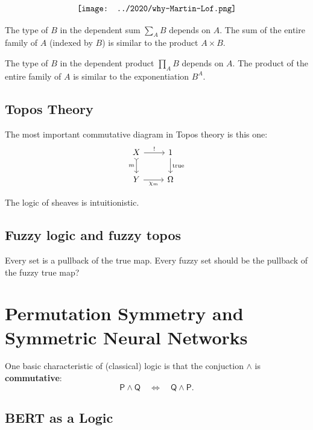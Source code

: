 \documentclass[orivec]{llncs}
\begin{document}
\begin{equation}
\label{eqn:2-levels-of-TT}
\vcenter{\hbox{\texttt{[image: ../2020/why-Martin-Lof.png]}}}
\end{equation}

The type of $B$ in the dependent sum $\displaystyle \sum_A B$ depends on $A$. The sum of the entire family of $A$ (indexed by $B$) is similar to the product $A \times B$.

The type of $B$ in the dependent product $\displaystyle \prod_A B$ depends on $A$. The product of the entire family of $A$ is similar to the exponentiation $B^A$.

\subsection{Topos Theory}

The most important commutative diagram in Topos theory is this one:
\begin{equation}
\label{eqn:subobject-classifier}
\begin{tikzcd}[column sep = normal]
X \arrow[r, "!"] \arrow[d, tail, swap, "m"] & 1 \arrow[d, "\mathrm{true}"] \\
Y \arrow[r, swap, "\chi_m"] & \Omega
\end{tikzcd}
\end{equation}

The logic of sheaves is intuitionistic.

\subsection{Fuzzy logic and fuzzy topos}

Every set is a pullback of the true map.  Every fuzzy set should be the pullback of the fuzzy true map?

\section{Permutation Symmetry and Symmetric Neural Networks}

One basic characteristic of (classical) logic is that the conjuction $\wedge$ is \textbf{commutative}:
\begin{equation}
\mathsf{P} \wedge \mathsf{Q} \quad \Leftrightarrow \quad \mathsf{Q} \wedge \mathsf{P} .
\end{equation}


\subsection{BERT as a Logic}
\end{document}
